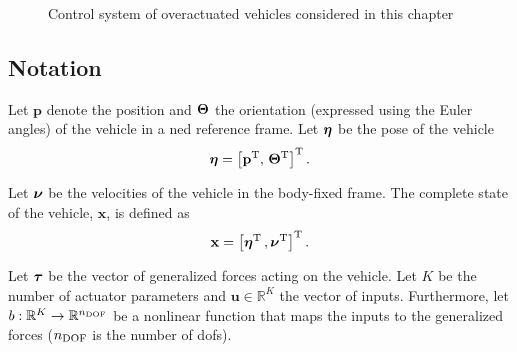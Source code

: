 \begin{figure}[t]
    \centering
    
    \vspace{-1mm}
    \caption{Control system of overactuated vehicles considered in this chapter}
    \label{fig:ccta_diagram}
\end{figure}

\subsection{Notation}
\label{sec:ccta_notation}

Let $\mathbf{p}$ denote the position and $\bm{\Theta}$ the orientation (expressed using the Euler angles) of the vehicle in a \acrfull{ned} reference frame.
%
Let $\bm{\eta}$ be the pose of the vehicle
\begin{equation}
    \bm{\eta} = \left[ \mathbf{p}^{\rm T} ,\, \bm{\Theta}^{\rm T} \right]^{\rm T}.
\end{equation}

Let $\bm{\nu}$ be the velocities of the vehicle in the body-fixed frame.
%
The complete state of the vehicle, $\mathbf{x}$, is defined as
\begin{equation}
    \mathbf{x} = \left[ \bm{\eta}^{\rm T} \,, \bm{\nu}^{\rm T} \right]^{\rm T}.
\end{equation}

Let $\bm{\tau}$ be the vector of generalized forces acting on the vehicle.
Let $K$ be the number of actuator parameters and $\mathbf{u} \in \mathbb{R}^{K}$ the vector of inputs.
Furthermore, let $b : \mathbb{R}^{K} \rightarrow \mathbb{R}^{n_{\rm DOF}}$ be a nonlinear function that maps the inputs to the generalized forces ($n_{\rm DOF}$ is the number of \glspl{dof}).


